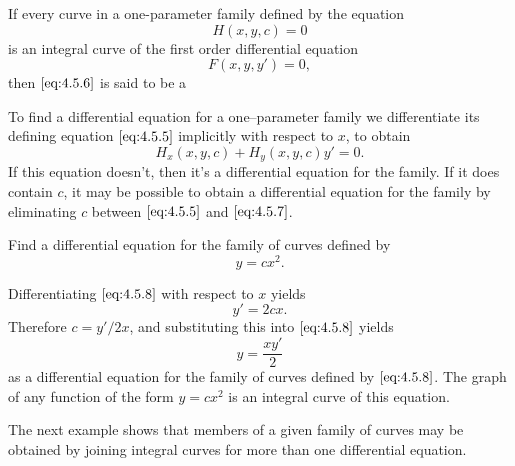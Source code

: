 \documentclass{ximera}
\begin{document}
\begin{definition}\label{thmtype:4.5.2}
If every curve in a one-parameter family defined by the equation
\begin{equation} \label{eq:4.5.5}
H(x,y,c)=0
\end{equation}
is an integral curve of the first order differential equation
\begin{equation} \label{eq:4.5.6}
F(x,y,y')=0,
\end{equation}
then  $\eqref{eq:4.5.6}$ is said to be a 
\end{definition}
 
To find a differential equation for a one--parameter family we
differentiate its defining equation $\eqref{eq:4.5.5}$ implicitly with
respect to $x$, to obtain
\begin{equation} \label{eq:4.5.7}
H_x(x,y,c)+H_y(x,y,c)y'=0.
\end{equation}
If this equation doesn't, then it's a differential
equation for the family. If it does contain $c$, it may be
possible to obtain a differential equation for the family by
eliminating $c$ between $\eqref{eq:4.5.5}$ and $\eqref{eq:4.5.7}$.
 
\begin{example}\label{example:4.5.5}
Find a differential equation for the family of curves defined by
\begin{equation}  \label{eq:4.5.8}
y=cx^2.
\end{equation}
 
 
\begin{explanation} Differentiating
$\eqref{eq:4.5.8}$ with respect to $x$ yields
$$
y'=2cx.
$$
 Therefore $c=y'/2x$, and substituting this into
$\eqref{eq:4.5.8}$ yields
$$
y=\frac{xy'}{2}
$$
 as a differential equation for the family of
curves defined by $\eqref{eq:4.5.8}$.  The graph of any function of
the form $y=cx^2$ is an integral curve of this equation. \end{explanation}
\end{example}
 
The next example shows that members of a given family of curves
may be obtained by joining  integral curves for more than one
differential equation.
 
\end{document}
